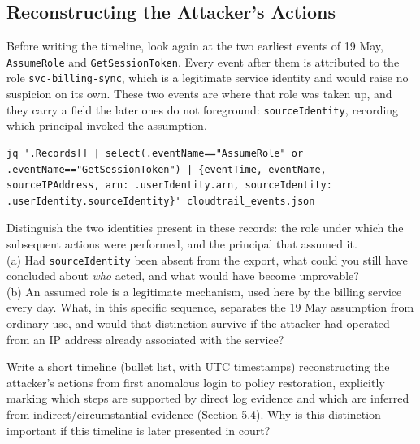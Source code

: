 \begin{answerbox}
\vspace{3cm}
\end{answerbox}

\subsection{Reconstructing the Attacker's Actions}

Before writing the timeline, look again at the two earliest events of 19 May, \texttt{AssumeRole} and \texttt{GetSessionToken}. Every event after them is attributed to the role \texttt{svc-billing-sync}, which is a legitimate service identity and would raise no suspicion on its own. These two events are where that role was taken up, and they carry a field the later ones do not foreground: \texttt{sourceIdentity}, recording which principal invoked the assumption.

\begin{lstlisting}
jq '.Records[] | select(.eventName=="AssumeRole" or .eventName=="GetSessionToken") | {eventTime, eventName, sourceIPAddress, arn: .userIdentity.arn, sourceIdentity: .userIdentity.sourceIdentity}' cloudtrail_events.json
\end{lstlisting}

\begin{questionbox}
Distinguish the two identities present in these records: the role under which the subsequent actions were performed, and the principal that assumed it.
\\
(a) Had \texttt{sourceIdentity} been absent from the export, what could you still have concluded about \emph{who} acted, and what would have become unprovable?
\\
(b) An assumed role is a legitimate mechanism, used here by the billing service every day. What, in this specific sequence, separates the 19 May assumption from ordinary use, and would that distinction survive if the attacker had operated from an IP address already associated with the service?
\end{questionbox}

\begin{answerbox}
\vspace{3.5cm}
\end{answerbox}

\begin{questionbox}
Write a short timeline (bullet list, with UTC timestamps) reconstructing the attacker's actions
from first anomalous login to policy restoration, explicitly marking which steps are supported
by direct log evidence and which are inferred from indirect/circumstantial evidence (Section
5.4). Why is this distinction important if this timeline is later presented in court?
\end{questionbox}

\begin{answerbox}
\vspace{3.5cm}
\end{answerbox}
